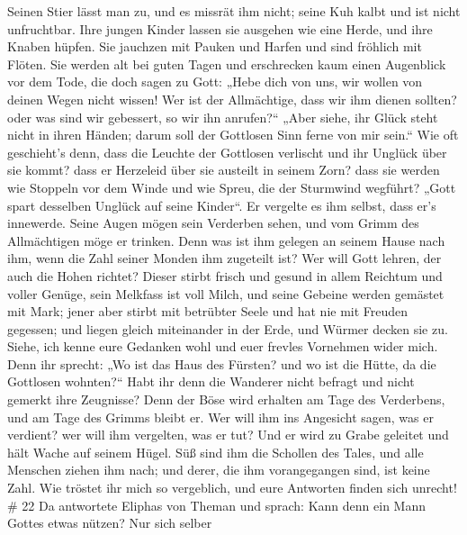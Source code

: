 Seinen Stier lässt man zu, und es missrät ihm nicht; seine Kuh kalbt und
ist nicht unfruchtbar.  Ihre jungen Kinder lassen sie
ausgehen wie eine Herde, und ihre Knaben hüpfen.  Sie
jauchzen mit Pauken und Harfen und sind fröhlich mit Flöten.
 Sie werden alt bei guten Tagen und erschrecken kaum einen
Augenblick vor dem Tode,  die doch sagen zu Gott: „Hebe
dich von uns, wir wollen von deinen Wegen nicht wissen! 
Wer ist der Allmächtige, dass wir ihm dienen sollten? oder was sind wir
gebessert, so wir ihn anrufen?{}``  „Aber siehe, ihr Glück
steht nicht in ihren Händen; darum soll der Gottlosen Sinn ferne von mir
sein.``  Wie oft geschieht's denn, dass die Leuchte der
Gottlosen verlischt und ihr Unglück über sie kommt? dass er Herzeleid
über sie austeilt in seinem Zorn?  dass sie werden wie
Stoppeln vor dem Winde und wie Spreu, die der Sturmwind wegführt?
 „Gott spart desselben Unglück auf seine Kinder``. Er
vergelte es ihm selbst, dass er's innewerde.  Seine Augen
mögen sein Verderben sehen, und vom Grimm des Allmächtigen möge er
trinken.  Denn was ist ihm gelegen an seinem Hause nach
ihm, wenn die Zahl seiner Monden ihm zugeteilt ist?  Wer
will Gott lehren, der auch die Hohen richtet?  Dieser
stirbt frisch und gesund in allem Reichtum und voller Genüge,
 sein Melkfass ist voll Milch, und seine Gebeine werden
gemästet mit Mark;  jener aber stirbt mit betrübter Seele
und hat nie mit Freuden gegessen;  und liegen gleich
miteinander in der Erde, und Würmer decken sie zu.  Siehe,
ich kenne eure Gedanken wohl und euer frevles Vornehmen wider mich.
 Denn ihr sprecht: „Wo ist das Haus des Fürsten? und wo ist
die Hütte, da die Gottlosen wohnten?{}``  Habt ihr denn die
Wanderer nicht befragt und nicht gemerkt ihre Zeugnisse? 
Denn der Böse wird erhalten am Tage des Verderbens, und am Tage des
Grimms bleibt er.  Wer will ihm ins Angesicht sagen, was er
verdient? wer will ihm vergelten, was er tut?  Und er wird
zu Grabe geleitet und hält Wache auf seinem Hügel.  Süß
sind ihm die Schollen des Tales, und alle Menschen ziehen ihm nach; und
derer, die ihm vorangegangen sind, ist keine Zahl.  Wie
tröstet ihr mich so vergeblich, und eure Antworten finden sich unrecht!
\# 22  Da antwortete Eliphas von Theman und sprach:
 Kann denn ein Mann Gottes etwas nützen? Nur sich selber
